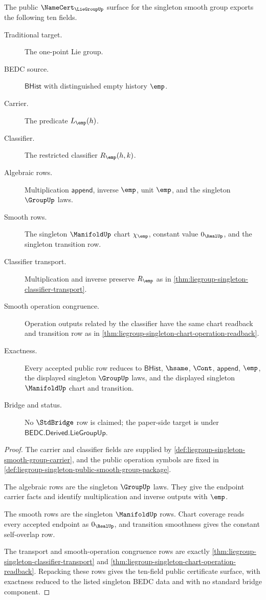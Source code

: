 \begin{theorem}
\label{thm:liegroup-singleton-public-namecert-export}
The public $\NameCert_{\LieGroupUp}$ surface for the singleton smooth group
exports the following ten fields.
\begin{description}
\item[Traditional target.] The one-point Lie group.
\item[BEDC source.] $\mathsf{BHist}$ with distinguished empty history $\emp$.
\item[Carrier.] The predicate $L_{\emp}(h)$.
\item[Classifier.] The restricted classifier $R_{\emp}(h,k)$.
\item[Algebraic rows.] Multiplication $\mathsf{append}$, inverse $\emp$, unit
$\emp$, and the singleton $\GroupUp$ laws.
\item[Smooth rows.] The singleton $\ManifoldUp$ chart $\chi_{\emp}$, constant
value $0_{\RealUp}$, and the singleton transition row.
\item[Classifier transport.] Multiplication and inverse preserve $R_{\emp}$ as
in \autoref{thm:liegroup-singleton-classifier-transport}.
\item[Smooth operation congruence.] Operation outputs related by the classifier
have the same chart readback and transition row as in
\autoref{thm:liegroup-singleton-chart-operation-readback}.
\item[Exactness.] Every accepted public row reduces to $\mathsf{BHist}$,
$\hsame$, $\Cont$, $\mathsf{append}$, $\emp$, the displayed singleton
$\GroupUp$ laws, and the displayed singleton $\ManifoldUp$ chart and transition.
\item[Bridge and status.] No $\StdBridge$ row is claimed; the paper-side target
is under $\mathsf{BEDC.Derived.LieGroupUp}$.
\end{description}
\end{theorem}
\begin{proof}
The carrier and classifier fields are supplied by
\autoref{def:liegroup-singleton-smooth-group-carrier}, and the public operation
symbols are fixed in
\autoref{def:liegroup-singleton-public-smooth-group-package}.

The algebraic rows are the singleton $\GroupUp$ laws. They give the endpoint
carrier facts and identify multiplication and inverse outputs with $\emp$.

The smooth rows are the singleton $\ManifoldUp$ rows. Chart coverage reads every
accepted endpoint as $0_{\RealUp}$, and transition smoothness gives the constant
self-overlap row.

The transport and smooth-operation congruence rows are exactly
\autoref{thm:liegroup-singleton-classifier-transport} and
\autoref{thm:liegroup-singleton-chart-operation-readback}. Repacking these rows
gives the ten-field public certificate surface, with exactness reduced to the
listed singleton BEDC data and with no standard bridge component.
\end{proof}

